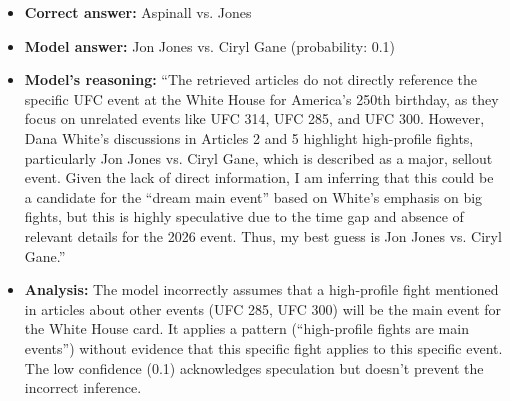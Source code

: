 \begin{itemize}
\item \textbf{Correct answer:} Aspinall vs. Jones
\item \textbf{Model answer:} Jon Jones vs. Ciryl Gane (probability: 0.1)
\item \textbf{Model's reasoning:} ``The retrieved articles do not directly reference the specific UFC event at the White House for America's 250th birthday, as they focus on unrelated events like UFC 314, UFC 285, and UFC 300. However, Dana White's discussions in Articles 2 and 5 highlight high-profile fights, particularly Jon Jones vs. Ciryl Gane, which is described as a major, sellout event. Given the lack of direct information, I am inferring that this could be a candidate for the ``dream main event'' based on White's emphasis on big fights, but this is highly speculative due to the time gap and absence of relevant details for the 2026 event. Thus, my best guess is Jon Jones vs. Ciryl Gane.''
\item \textbf{Analysis:} The model incorrectly assumes that a high-profile fight mentioned in articles about other events (UFC 285, UFC 300) will be the main event for the White House card. It applies a pattern (``high-profile fights are main events'') without evidence that this specific fight applies to this specific event. The low confidence (0.1) acknowledges speculation but doesn't prevent the incorrect inference.
\end{itemize}
\fi 
